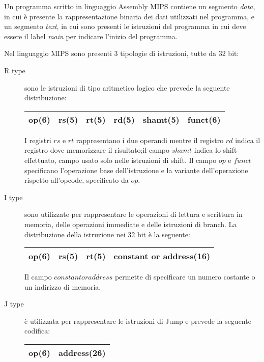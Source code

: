 Un programma scritto in linguaggio Assembly MIPS contiene un segmento \emph{data},
in cui è presente la rappresentazione binaria dei dati utilizzati nel programma,
e un segmento \emph{text}, in cui sono presenti le istruzioni del programma in cui
deve essere il label \emph{main} per indicare l'inizio del programma.

Nel linguaggio MIPS sono presenti 3 tipologie di istruzioni, tutte da 32 bit:
\begin{description}
  \item[R type] sono le istruzioni di tipo aritmetico logico che prevede la seguente distribuzione:\newline
        \begin{tabular}{|c|c|c|c|c|c|}
          \hline
           op(6) & rs(5) & rt(5) & rd(5) & shamt(5) & funct(6)\\
           \hline
        \end{tabular}\newline
        I registri $rs$ e $rt$ rappresentano i due operandi mentre il registro $rd$
        indica il registro dove memorizzare il risultato;il campo $shamt$ indica lo shift
        effettuato, campo usato solo nelle istruzioni di shift.\newline
        Il campo $op$ e $funct$ specificano l'operazione base dell'istruzione e la variante
        dell'operazione rispetto all'opcode, specificato da $op$.
  \item[I type] sono utilizzate per rappresentare le operazioni di lettura e scrittura
        in memoria, delle operazioni immediate e delle istruzioni di branch.
        La distribuzione della istruzione nei 32 bit è la seguente:\newline
        \begin{tabular}{|c|c|c|c|}
          \hline
           op(6) & rs(5) & rt(5) & constant or address(16)\\
           \hline
        \end{tabular}\newline
        Il campo $constant or address$ permette di specificare un numero costante
        o un indirizzo di memoria.
  \item[J type] è utilizzata per rappresentare le istruzioni di Jump e prevede la seguente codifica:
        \begin{tabular}{|c|c|}
          \hline
          op(6) & address(26)\\
          \hline
        \end{tabular}
\end{description}

